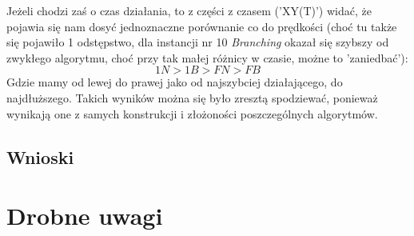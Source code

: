 \documentclass{article}
\begin{document}
Jeżeli chodzi zaś o czas działania, to z części z czasem ('XY(T)') widać, że pojawia się nam dosyć jednoznaczne porównanie co do prędkości (choć tu także się pojawiło 1 odstępstwo, dla instancji nr 10 \textit{Branching} okazał się szybszy od zwykłego algorytmu, choć przy tak małej różnicy w czasie, możne to 'zaniedbać'):
\[1N > 1B > FN > FB\]
Gdzie mamy od lewej do prawej jako od najszybciej działającego, do najdłuższego. Takich wyników można się było zresztą spodziewać, ponieważ wynikają one z samych konstrukcji i złożoności poszczególnych algorytmów.
\subsection{Wnioski}

\section*{Drobne uwagi}
\end{document}

